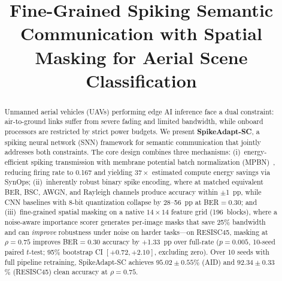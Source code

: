 \documentclass[conference]{IEEEtran}
\begin{document}
\title{Fine-Grained Spiking Semantic Communication with Spatial Masking for Aerial Scene Classification}

\author{
}


\maketitle

\begin{abstract}
Unmanned aerial vehicles (UAVs) performing edge AI inference face a dual constraint: air-to-ground links suffer from severe fading and limited bandwidth, while onboard processors are restricted by strict power budgets. We present \textbf{SpikeAdapt-SC}, a spiking neural network (SNN) framework for semantic communication that jointly addresses both constraints. The core design combines three mechanisms: (i)~energy-efficient spiking transmission with membrane potential batch normalization (MPBN)~\cite{guo2023mpbn}, reducing firing rate to 0.167 and yielding $37{\times}$ estimated compute energy savings via SynOps; (ii)~inherently robust binary spike encoding, where at matched equivalent BER, BSC, AWGN, and Rayleigh channels produce accuracy within $\pm$1~pp, while CNN baselines with 8-bit quantization collapse by 28--56~pp at BER${=}0.30$; and (iii)~fine-grained spatial masking on a native $14{\times}14$ feature grid (196~blocks), where a noise-aware importance scorer generates per-image masks that save 25\% bandwidth and can \emph{improve} robustness under noise on harder tasks---on RESISC45, masking at $\rho{=}0.75$ improves BER${=}0.30$ accuracy by $+$1.33~pp over full-rate ($p{=}0.005$, 10-seed paired $t$-test; 95\% bootstrap CI $[+0.72, +2.10]$, excluding zero). Over 10 seeds with full pipeline retraining, SpikeAdapt-SC achieves $95.02{\pm}0.55$\% (AID) and $92.34{\pm}0.33$\% (RESISC45) clean accuracy at $\rho{=}0.75$.
\end{abstract}
\end{document}

